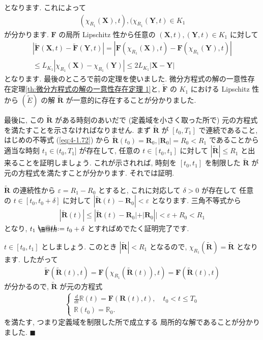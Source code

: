 \documentclass[openany, a4paper, oneside]{jsbook}
\makeatletter
\newcommand*{\defeq}{\mathrel{\rlap{%
\raisebox{0.3ex}{$\m@th\cdot$}}%
\raisebox{-0.3ex}{$\m@th\cdot$}}%
=}
\theoremstyle{break}
\theoremstyle{breakdefn}
\newcommand{\abs}[1]{\left|#1\right|}
\newcommand{\bbR}{\mathbb{R}}
\newcommand{\bR}{\mathbb{R}}
\newcommand{\vep}{\varepsilon}
\makeatother
\begin{document}
となります.
これによって
\begin{gather}
( \chi_{R_1} ( \bm{X} ) , t ) , ( \chi_{R_1} ( \bm{Y} , t ) \in K_1
\end{gather}
が分かります.
$\bm{F}$ の局所 Lipschitz 性から任意の $(\bm{X} , t ) , ( \bm{Y} , t )  \in K_1$ に対して
\begin{gather}
\abs{\tilde{ \bm{F} } ( \bm{X} , t ) - \tilde{ \bm{F} } ( \bm{Y} , t )}
=
\abs{\bm{F} ( \chi_{R_1} ( \bm{X} ) , t ) - \bm{F} ( \chi_{R_1} ( \bm{Y} ) , t )}\\
\leq
L_{K_1} | \chi_{R_1} ( \bm{X} ) - \chi_{R_1} ( \bm{Y} )  |
\leq
2 L_{K_1} | \bm{X} -  \bm{Y} |
\end{gather}
となります.
最後のところで前の定理を使いました.
微分方程式の解の一意性存在定理\ref{th:微分方程式の解の一意性存在定理 1}と,
$\tilde{ \bm{F} }$ の $K_1$ における Lipschitz 性から
$( \tilde{E} )$ の解 $\tilde{ \bm{R} }$ が一意的に存在することが分かりました.

最後に, この $\tilde{ \bm{R} }$ がある時刻のあいだで (定義域を小さく取った所で)
元の方程式を満たすことを示さなければなりません.
まず $\tilde { \bm{R} }$ が $[ t_0 , T_1 ]$ で連続であること,
はじめの不等式 (\ref{eq:4-1.72}) から
$\tilde{ \bm{R} } (t_0) = \bm{R}_0 , | \bm{R}_0 | = R_0 < R_1$
であることから
適当な時刻 $t_1 \in ( t_0 , T_1]$ が存在して, 任意の
$t \in [t_0 , t_1]$ に対して
$|\tilde{ \bm{R} }| \leq R_1$ と出来ることを証明しましょう.
これが示されれば, 時刻を $[t_0 , t_1]$ を制限した $\tilde{ \bm{R} }$ が元の方程式を満たすことが分かります.
それでは証明.

$\tilde{ \bm{R} }$ の連続性から $\vep = R_1 - R_0$ とすると,
これに対応して $\delta > 0$ が存在して
任意の $t \in [t_0 , t_0 + \delta]$ に対して
$| \tilde{ \bm{R} } (t) - \bm{R}_0 | < \vep$ となります.
三角不等式から
\begin{gather}
\abs{\tilde{ \bm{R} } (t)}
\leq
\abs{\tilde{ \bm{R} } (t) - \bm{R}_0 | + | \bm{R}_0}|
<
\vep + R_0
<
R_1
\end{gather}
となり,  $t_1 \defeq t_0 + \delta$ とすればめでたく証明完了です.

$t \in [ t_0 , t_1 ]$ としましょう.
このとき $| \tilde{ \bm{R} } | < R_1$ となるので,
$\chi _{R_1} ( \tilde{ \bm{R} } ) = \tilde{ \bm{R} }$ となります.
したがって
\begin{gather}
\tilde{ \bm{F} } ( \tilde{ \bm{R} }(t) , t)
=
\bm{F} ( \chi_{R_1} ( \tilde{ \bm{R} } (t) ) , t )
=
\bm{F} ( \tilde{\bm{R}}(t) , t )
\end{gather}
が分かるので,  $\tilde{\bm{R}}$ が元の方程式
\begin{gather}
\begin{cases}
\frac{d} {dt} \bbR (t) = \bm{F} ( \bm{R} (t) , t ), \quad t_0 < t \leq T_0 \\
\bbR (t_0) = \bR_0 .
\end{cases}
\end{gather}
を満たす, つまり定義域を制限した所で成立する
局所的な解であることが分かりました.  $\blacksquare$
\end{document}
